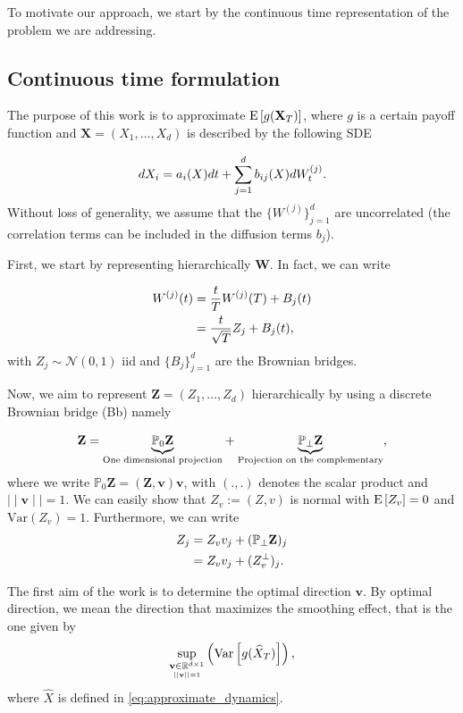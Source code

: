 To motivate our approach, we start  by the continuous time representation of the problem we are addressing.
\subsection{Continuous time formulation}

The purpose of this work is to approximate $\mathrm{E}\left[g(\mathbf{X}_T)\right]$, where $g$ is a certain payoff function and $\mathbf{X}=(X_1, \dots, X_d)$ is described by the following SDE

\begin{equation}\label{eq:SDE_interest}
dX_i=a_i(X) dt + \sum_{j=1}^d b_{ij}(X) dW_t^{(j)} .
\end{equation}
Without  loss of generality, we assume that the $\{W^{(j)}\}_{j=1}^d$ are uncorrelated (the correlation terms can be included  in the diffusion terms $b_j$).

First, we start by representing hierarchically $\mathbf{W}$. In fact, we can write 

\begin{align}
W^{(j)}(t)&= \frac{t}{T} W^{(j)}(T)+B_j(t) \nonumber\\
&= \frac{t}{\sqrt{T}} Z_j+B_j(t),
\end{align}
with $Z_j \sim \mathcal{N}(0,1)$ iid and $\{B_j\}_{j=1}^d$ are the Brownian bridges.

Now, we aim to represent $\mathbf{Z}=(Z_1,\dots,Z_d)$ hierarchically by using a discrete Brownian bridge (Bb) namely

\begin{equation}\label{eq:smoothing_decomposition}
\mathbf{Z}= \underset{\text{One dimensional projection}}{\underbrace{\mathbb{P}_0 \mathbf{Z}}} +  \underset{\text{Projection on the complementary}} {\underbrace{\mathbb{P}_{\perp} \mathbf{Z}}},
\end{equation} 
where we write $\mathbb{P}_0 \mathbf{Z}=(\mathbf{Z}, \mathbf{v}) \mathbf{v}$, with $(.,.)$ denotes the scalar product and $\mid \mid \mathbf{v} \mid \mid=1$. We can easily show that $Z_v:=(Z,v)$ is normal with $\mathrm{E}\left[Z_v\right]=0$ and $\text{Var}(Z_v)=1$. Furthermore, we can write
\begin{align}\label{eq:smoothing_decomposition_componentwise}
Z_j&=Z_v v_j+ (\mathbb{P}_{\perp} \mathbf{Z})_j\nonumber \\
&=Z_v v_j+ (Z_v^\perp)_j .
\end{align}

The first aim of the work is to determine the optimal direction $\mathbf{v}$. By optimal direction, we mean the direction that maximizes the smoothing effect, that is the one given by
\begin{align}\label{optimality_criterion_2}
\underset{\underset{\mid \mid \mathbf{v}\mid \mid=1} {\mathbf{v} \in \mathbb{R}^{d \times 1}}}{\operatorname{\sup}} \left(\text{Var}\left[ g(\widehat{X}_T) \right] \right) ,
\end{align}
where $\hat{X}$ is defined in \eqref{eq:approximate_dynamics}.


